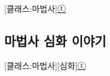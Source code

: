 \documentclass{report}
\begin{document}
	\begin{story}{}{[클래스:마법사]\hyperlink{celesteela}{ⓣ}}
		
	\end{story}
	
	\subsection{마법사 심화 이야기}
		\begin{story}{}{[클래스:마법사][심화]\hyperlink{celesteela}{ⓣ}}
			
		\end{story}
\end{document}
